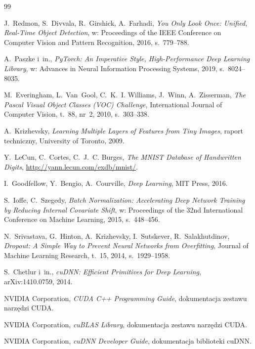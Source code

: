 \begin{thebibliography}{99}

J.~Redmon, S.~Divvala, R.~Girshick, A.~Farhadi,
\textit{You Only Look Once: Unified, Real-Time Object Detection},
w: Proceedings of the IEEE Conference on Computer Vision and Pattern Recognition, 2016, s.~779--788.

A.~Paszke i~in.,
\textit{PyTorch: An Imperative Style, High-Performance Deep Learning Library},
w: Advances in Neural Information Processing Systems, 2019, s.~8024--8035.

M.~Everingham, L.~Van~Gool, C.~K.~I. Williams, J.~Winn, A.~Zisserman,
\textit{The Pascal Visual Object Classes (VOC) Challenge},
International Journal of Computer Vision, t.~88, nr~2, 2010, s.~303--338.

A.~Krizhevsky,
\textit{Learning Multiple Layers of Features from Tiny Images},
raport techniczny, University of Toronto, 2009.

Y.~LeCun, C.~Cortes, C.~J.~C. Burges,
\textit{The MNIST Database of Handwritten Digits},
\url{http://yann.lecun.com/exdb/mnist/}.

I.~Goodfellow, Y.~Bengio, A.~Courville,
\textit{Deep Learning},
MIT Press, 2016.

S.~Ioffe, C.~Szegedy,
\textit{Batch Normalization: Accelerating Deep Network Training by Reducing Internal Covariate Shift},
w: Proceedings of the 32nd International Conference on Machine Learning, 2015, s.~448--456.

N.~Srivastava, G.~Hinton, A.~Krizhevsky, I.~Sutskever, R.~Salakhutdinov,
\textit{Dropout: A Simple Way to Prevent Neural Networks from Overfitting},
Journal of Machine Learning Research, t.~15, 2014, s.~1929--1958.

S.~Chetlur i~in.,
\textit{cuDNN: Efficient Primitives for Deep Learning},
arXiv:1410.0759, 2014.

NVIDIA Corporation,
\textit{CUDA C++ Programming Guide},
dokumentacja zestawu narzędzi CUDA.

NVIDIA Corporation,
\textit{cuBLAS Library},
dokumentacja zestawu narzędzi CUDA.

NVIDIA Corporation,
\textit{cuDNN Developer Guide},
dokumentacja biblioteki cuDNN.

\end{thebibliography}
